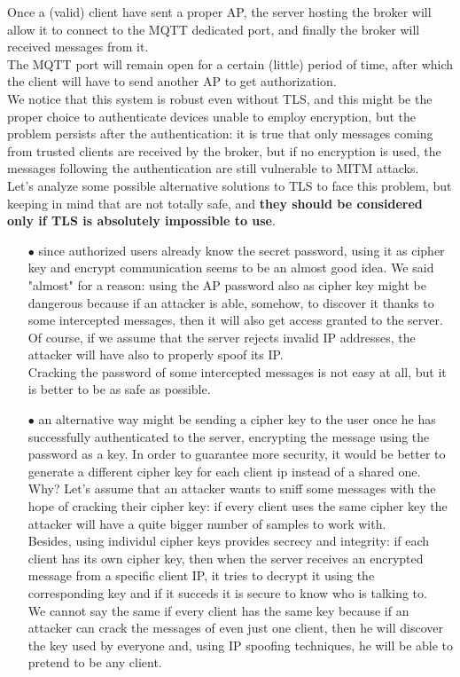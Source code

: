 \documentclass[12pt]{report}
\begin{document}
{Once a (valid) client have sent a proper AP, the server hosting the broker will allow it to connect to the MQTT dedicated port, and finally the broker will received messages from it.\\
The MQTT port will remain open for a certain (little) period of time, after which the client will have to send another AP to get authorization.\\

We notice that this system is robust even without TLS, and this might be the proper choice to authenticate devices unable to employ encryption, but the problem persists after the authentication: it is true that only messages coming from trusted clients are received by the broker, but if no encryption is used, the messages following the authentication are still vulnerable to MITM attacks.\\

Let's analyze some possible alternative solutions to TLS to face this problem, but keeping in mind that are not totally safe, and \textbf{they should be considered only if TLS is absolutely impossible to use}.

\begin{itemize}
\setlength{\itemindent}{+4mm}
\item[$\bullet$] since authorized users already know the secret password, using it as cipher key and encrypt communication seems to be an almost good idea. We said "almost" for a reason: using the AP password also as cipher key might be dangerous because if an attacker is able, somehow, to discover it thanks to some intercepted messages, then it will also get access granted to the server.\\
Of course, if we assume that the server rejects invalid IP addresses, the attacker will have also to properly spoof its IP.\\
Cracking the password of some intercepted messages is not easy at all, but it is better to be as safe as possible.
\item[$\bullet$] an alternative way might be sending a cipher key to the user once he has successfully authenticated to the server, encrypting the message using the password as a key. In order to guarantee more security, it would be better to generate a different cipher key for each client ip instead of a shared one. Why?
Let's assume that an attacker wants to sniff some messages with the hope of cracking their cipher key: if every client uses the same cipher key the attacker will have a quite bigger number of samples to work with.\\
Besides, using individul cipher keys provides secrecy and integrity: if each client has its own cipher key, then when the server receives an encrypted message from a specific client IP, it tries to decrypt it using the corresponding key and if it succeds it is secure to know who is talking to.\\
We cannot say the same if every client has the same key because if an attacker can crack the messages of even just one client, then he will discover the key used by everyone and, using IP spoofing techniques, he will be able to pretend to be any client.\\


\end{itemize}}
\end{document}
